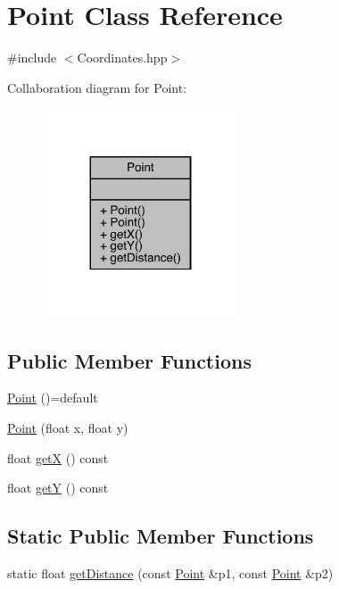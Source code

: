 \hypertarget{class_point}{}\section{Point Class Reference}
\label{class_point}


{\ttfamily \#include $<$Coordinates.\+hpp$>$}



Collaboration diagram for Point\+:
\nopagebreak
\begin{figure}[H]
\begin{center}
\leavevmode
\includegraphics[width=164pt]{class_point__coll__graph}
\end{center}
\end{figure}
\subsection*{Public Member Functions}
\begin{DoxyCompactItemize}
\item 
\hyperlink{class_point_a257415ad611a16bb73628efcdb87d0fd}{Point} ()=default
\item 
\hyperlink{class_point_a30bc8409287de4f43e160664be834636}{Point} (float x, float y)
\item 
float \hyperlink{class_point_a29c44ec7c7279e02629645a06cdaf7d5}{getX} () const
\item 
float \hyperlink{class_point_a2371ffadbe245d12a8f556d0a976521b}{getY} () const
\end{DoxyCompactItemize}
\subsection*{Static Public Member Functions}
\begin{DoxyCompactItemize}
\item 
static float \hyperlink{class_point_a1dbe2026f242cd96843ea14a67e8a2c3}{get\+Distance} (const \hyperlink{class_point}{Point} \&p1, const \hyperlink{class_point}{Point} \&p2)
\end{DoxyCompactItemize}


